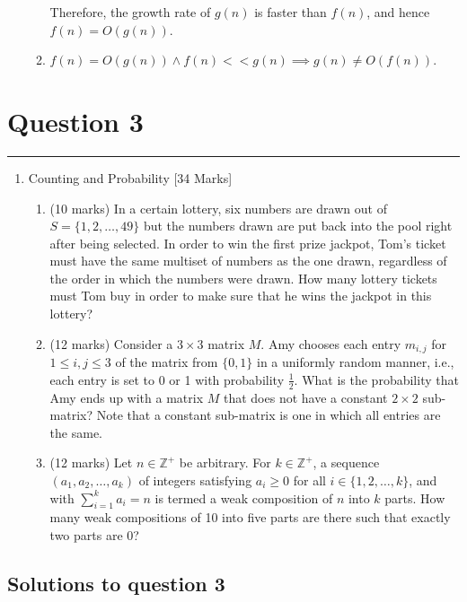 \documentclass{article}
\begin{document}
\begin{enumerate}[label=(\alph*)]
\begin{enumerate}[label=\roman*.]
                    Therefore, the growth rate of $g(n)$ is faster than $f(n)$, and hence $f(n) = O(g(n))$.

              \item $f(n) = O(g(n)) \land f(n) << g(n)\implies g(n) \neq O(f(n))$.
          \end{enumerate}
\end{enumerate}

\newpage
\section*{Question 3}
\hrule
\vspace{0.5cm}

\begin{enumerate}
    \item Counting and Probability [34 Marks]
          \begin{enumerate}[label=(\alph*)]
              \item (10 marks) In a certain lottery, six numbers are drawn out of \( S = \{1, 2, \ldots, 49\} \) but the numbers drawn are put back into the pool right after being selected. In order to win the first prize jackpot, Tom's ticket must have the same multiset of numbers as the one drawn, regardless of the order in which the numbers were drawn. How many lottery tickets must Tom buy in order to make sure that he wins the jackpot in this lottery?
              \item (12 marks) Consider a \(3 \times 3\) matrix \(M\). Amy chooses each entry \(m_{i,j}\) for \(1 \le i, j \le 3\) of the matrix from \(\{0, 1\}\) in a uniformly random manner, i.e., each entry is set to 0 or 1 with probability \(\frac{1}{2}\). What is the probability that Amy ends up with a matrix \(M\) that does not have a constant \(2 \times 2\) sub-matrix? Note that a constant sub-matrix is one in which all entries are the same.
              \item (12 marks) Let \(n \in \mathbb{Z}^+\) be arbitrary. For \(k \in \mathbb{Z}^+\), a sequence \((a_1, a_2, \ldots, a_k)\) of integers satisfying \(a_i \ge 0\) for all \(i \in \{1, 2, \ldots, k\}\), and with \(\sum_{i=1}^{k} a_i = n\) is termed a weak composition of \(n\) into \(k\) parts. How many weak compositions of 10 into five parts are there such that exactly two parts are 0?
          \end{enumerate}
\end{enumerate}

\subsection*{Solutions to question 3}
\end{document}
